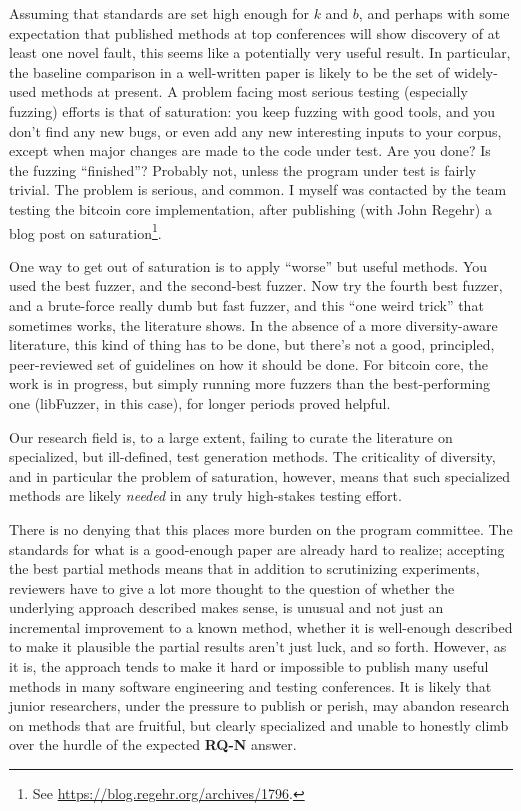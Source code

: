\documentclass[sigplan,screen]{acmart}
\begin{document}
Assuming that standards are set high enough for $k$ and $b$, and
perhaps with some expectation that published methods at top
conferences will show discovery of at least one novel fault, this
seems like a potentially very useful result.  In particular, the
baseline comparison in a well-written paper is likely to be the set of
widely-used methods at present.  A problem facing most serious testing
(especially fuzzing) efforts is that of saturation:  you keep fuzzing
with good tools, and you don't find any new bugs, or even add any new
interesting inputs to your corpus, except when major changes are made
to the code under test.  Are you done?  Is the fuzzing ``finished''?
Probably not, unless the program under test is fairly trivial.  The
problem is serious, and common.  I myself was contacted by the team
testing the bitcoin core implementation, after publishing (with John
Regehr) a blog post
on saturation\footnote{See
  \url{https://blog.regehr.org/archives/1796}.}.

One way to get out of saturation is to apply ``worse'' but useful
methods.  You used the best fuzzer, and the second-best fuzzer.  Now
try the fourth best fuzzer, and a brute-force really dumb but fast
fuzzer, and this ``one weird trick'' that sometimes works, the
literature shows.  In the absence of a more diversity-aware
literature, this kind of thing has to be done, but there's not a good,
principled, peer-reviewed set of guidelines on how it should be done.
For bitcoin core, the work is in progress, but simply running more
fuzzers than the best-performing one (libFuzzer, in this case), for
longer periods proved helpful.

Our research field is, to a large extent, failing to curate the
literature on specialized, but ill-defined, test generation methods.
The criticality of diversity, and in particular the problem of
saturation, however, means that such specialized methods are likely
\emph{needed} in any truly high-stakes testing effort.

There is no denying that this places more burden on the program
committee.  The standards for what is a good-enough paper are already
hard to realize; accepting the best partial methods means that in
addition to scrutinizing experiments, reviewers have to give a lot
more thought to the question of whether the underlying approach
described makes sense, is unusual and not just an incremental
improvement to a known method, whether it is well-enough described to
make it plausible the partial results aren't just luck, and so forth.
However, as it is, the approach tends to make it hard or impossible to
publish many useful methods in many software engineering and testing
conferences.  It is likely that junior researchers, under the pressure
to publish or perish, may abandon research on methods that are fruitful, but
clearly specialized and unable to honestly climb over the hurdle of
the expected {\bf RQ-N} answer.
\end{document}
